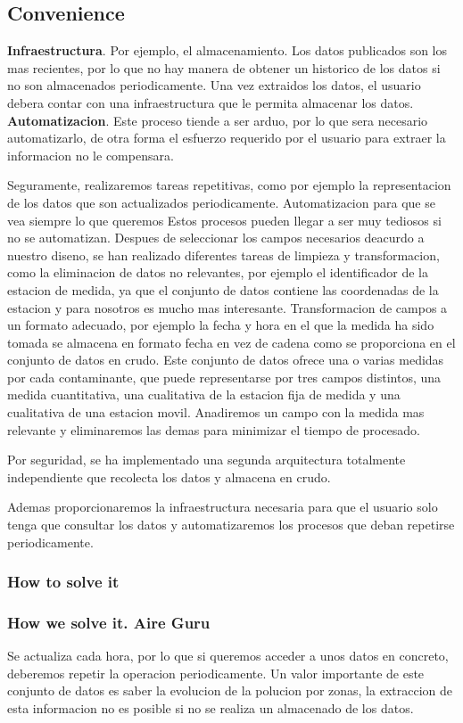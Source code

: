 \subsection{Convenience}
  \textbf{Infraestructura}. Por ejemplo, el almacenamiento. Los datos publicados son los mas recientes, por lo que no hay manera de obtener 
un historico de los datos si no son almacenados periodicamente. Una vez extraidos los datos, el usuario debera 
contar con una infraestructura que le permita almacenar los datos.
 \textbf{Automatizacion}. Este proceso tiende a ser arduo, por lo que sera necesario automatizarlo, de otra 
forma el esfuerzo requerido por el usuario para extraer la informacion no le compensara. 

Seguramente, realizaremos tareas repetitivas, como por ejemplo la representacion de los datos que son actualizados periodicamente.
Automatizacion para que se vea siempre lo que queremos
Estos procesos pueden llegar
a ser muy tediosos si no se automatizan.
Despues de seleccionar los campos necesarios deacurdo a nuestro diseno, se han realizado diferentes tareas de limpieza y transformacion,
como la eliminacion de datos no relevantes, por ejemplo el identificador de la estacion de medida, ya que el conjunto de datos
contiene las coordenadas de la estacion y para nosotros es mucho mas interesante.
Transformacion de campos a un formato adecuado, por ejemplo la fecha y hora en el que la medida ha sido tomada se almacena en formato fecha
en vez de cadena como se proporciona en el conjunto de datos en crudo.
Este conjunto de datos ofrece una o varias medidas por cada contaminante, que puede representarse por tres campos distintos, una medida 
cuantitativa, una cualitativa de la estacion fija de medida y una cualitativa de una estacion movil. Anadiremos un campo con la medida
mas relevante y eliminaremos las demas para minimizar el tiempo de procesado.

Por seguridad, se ha implementado una segunda arquitectura totalmente independiente que recolecta los datos y almacena en crudo.

Ademas proporcionaremos
la infraestructura necesaria para que el usuario solo tenga que consultar los datos y automatizaremos los procesos que deban repetirse
periodicamente.


\subsubsection{How to solve it} 
\subsubsection{How we solve it. Aire Guru} 
Se actualiza cada hora, por lo que si queremos acceder a unos datos en concreto, deberemos repetir la operacion periodicamente.
Un valor importante de este conjunto de datos es saber la evolucion de la polucion por zonas, la extraccion de esta informacion no es posible
si no se realiza un almacenado de los datos.

